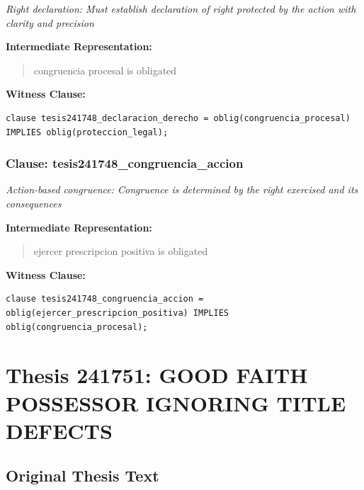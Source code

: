 \documentclass[11pt,a4paper]{article}
\begin{document}
\textit{Right declaration: Must establish declaration of right protected by the action with clarity and precision}

\textbf{Intermediate Representation:}

\begin{quote}
congruencia procesal is obligated
\end{quote}

\textbf{Witness Clause:}

\begin{lstlisting}[style=witnessstyle, language=Witness]
clause tesis241748_declaracion_derecho = oblig(congruencia_procesal) IMPLIES oblig(proteccion_legal);
\end{lstlisting}

\subsubsection{Clause: tesis241748\_congruencia\_accion}

\textit{Action-based congruence: Congruence is determined by the right exercised and its consequences}

\textbf{Intermediate Representation:}

\begin{quote}
ejercer prescripcion positiva is obligated
\end{quote}

\textbf{Witness Clause:}

\begin{lstlisting}[style=witnessstyle, language=Witness]
clause tesis241748_congruencia_accion = oblig(ejercer_prescripcion_positiva) IMPLIES oblig(congruencia_procesal);
\end{lstlisting}

\newpage

\section{Thesis 241751: GOOD FAITH POSSESSOR IGNORING TITLE DEFECTS}
\label{thesis:241751}

\subsection{Original Thesis Text}
\end{document}
